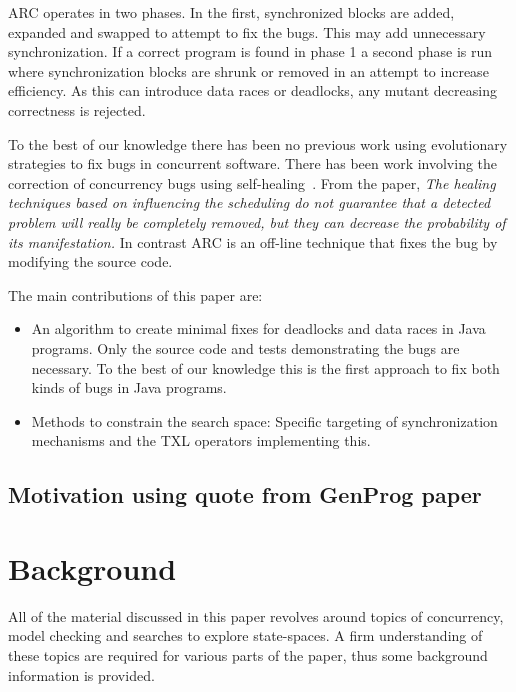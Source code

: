 \documentclass[10pt, conference, compsocconf]{IEEEtran}
\begin{document}
ARC operates in two phases. In the first, synchronized blocks are added,
expanded and swapped to attempt to fix the bugs. This may add unnecessary
synchronization. If a correct program is found in phase 1 a second phase is run
where synchronization blocks are shrunk or removed in an attempt to increase
efficiency. As this can introduce data races or deadlocks, any mutant
decreasing correctness is rejected.

To the best of our knowledge there has been no previous work using evolutionary
strategies to fix bugs in concurrent software.  There has been work involving
the correction of concurrency bugs using self-healing~\cite{LVK08}. From the
paper, \textit{The healing techniques based on influencing the scheduling do
not guarantee that a detected problem will really be completely removed, but
they can decrease the probability of its manifestation.} In contrast ARC is an
off-line technique that fixes the bug by modifying the source code.

The main contributions of this paper are:

\begin{itemize}

\item An algorithm to create minimal fixes for deadlocks and data races in Java
programs. Only the source code and tests demonstrating the bugs are necessary.
To the best of our knowledge this is the first approach to fix both kinds of
bugs in Java programs.

\item Methods to constrain the search space: Specific targeting of
synchronization mechanisms and the TXL operators implementing this.

\end{itemize}




\subsection{Motivation using quote from GenProg paper}




\section{Background}
\label{sec:background}
All of the material discussed in this paper revolves around topics of
concurrency, model checking and searches to explore state-spaces. A firm
understanding of these topics are required for various parts of the paper, thus
some background information is provided.
\end{document}
